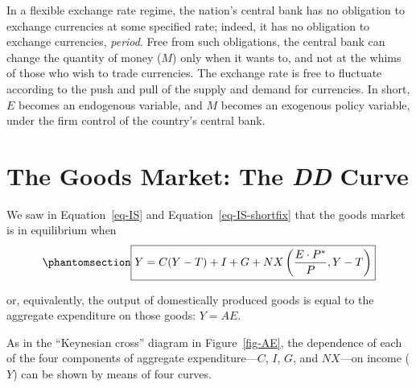 \documentclass[
  letterpaper,
]{book}
\theoremstyle{plain}
\theoremstyle{remark}
\begin{document}
In a flexible exchange rate regime, the nation's central bank has no
obligation to exchange currencies at some specified rate; indeed, it has
no obligation to exchange currencies, \emph{period}. Free from such
obligations, the central bank can change the quantity of money (\(M\))
only when it wants to, and not at the whims of those who wish to trade
currencies. The exchange rate is free to fluctuate according to the push
and pull of the supply and demand for currencies. In short, \(E\)
becomes an endogenous variable, and \(M\) becomes an exogenous policy
variable, under the firm control of the country's central bank.

\section{\texorpdfstring{The Goods Market: The \emph{DD}
Curve}{The Goods Market: The DD Curve}}\label{sec-goods-short-temp}


We saw in Equation~\ref{eq-IS} and Equation~\ref{eq-IS-shortfix} that
the goods market is in equilibrium when
\begin{equation}\phantomsection\label{eq-IS-short-temp}{
\fbox{$\displaystyle Y=C(Y-T)+I+G+NX\left(\frac{E\cdot P^*}{P},Y-T\right)$}
}\end{equation}

or, equivalently, the output of domestically produced goods is equal to
the aggregate expenditure on those goods: \(Y=AE\).

As in the ``Keynesian cross'' diagram in Figure~\ref{fig-AE}, the
dependence of each of the four components of aggregate
expenditure---\(C\), \(I\), \(G\), and \(NX\)---on income (\(Y\)) can be
shown by means of four curves.
\end{document}
